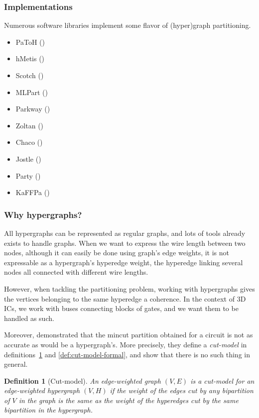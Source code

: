 \documentclass[11pt,a4paper]{article}
\theoremstyle{customdef}
\newtheorem{definition}{Definition}
\begin{document}
\subsubsection{Implementations}
Numerous software libraries implement some flavor of (hyper)graph partitioning.
\begin{itemize}
	\item PaToH (\citet{Aykanat2011})
	\item hMetis (\citet{Karypis1999})
	\item Scotch (\citet{Aykanat2011})
	\item MLPart (\citet{Caldwell2000})
	\item Parkway (\citet{Trifunovic2008})
	\item Zoltan (\citet{Devine2006})
	\item Chaco (\citet{Lotfifar2015})
	\item Jostle (\citet{Walshaw1998})
	\item Party (\citet{Preis97party})
	\item KaFFPa (\citet{Holtgrewe2010})
\end{itemize}
\subsubsection{Why hypergraphs?}
All hypergraphs can be represented as regular graphs, and lots of tools already exists to handle graphs.
When we want to express the wire length between two nodes, although it can easily be done using graph's edge weights, it is not expressable as a hypergraph's hyperedge weight, the hyperedge linking several nodes all connected with different wire lengths.

However, when tackling the partitioning problem, working with hypergraphs gives the vertices belonging to the same hyperedge a coherence.
In the context of 3D ICs, we work with buses connecting blocks of gates, and we want them to be handled as such.

Moreover, \citet{Ihler1993} demonstrated that the mincut partition obtained for a circuit is not as accurate as would be a hypergraph's.
More precisely, they define a \textit{cut-model} in definitions~\ref{def:cut-model} and \ref{def:cut-model-formal}, and show that there is no such thing in general.

\begin{definition}[Cut-model]\label{def:cut-model}
An edge-weighted graph $(V,E)$ is a cut-model for an edge-weighted hypergraph $(V,H)$ if the weight of the edges cut by any bipartition of $V$ in the graph is the same as the weight of the hyperedges cut by the same bipartition in the hypergraph.
\end{definition}
\end{document}
